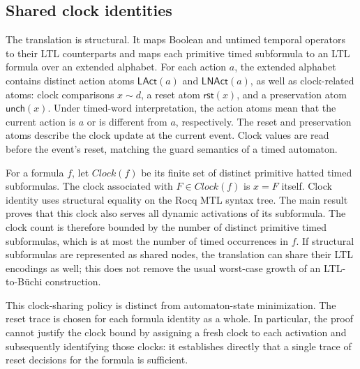 \documentclass[manuscript]{acmart}
\providecommand{\Reset}{}\renewcommand{\Reset}{\mathsf{rst}}
\newcommand{\Unch}{\mathsf{unch}}
\newcommand{\Clock}{\mathit{Clock}}
\begin{document}
\subsection{Shared clock identities}
The translation is structural. It maps Boolean and untimed temporal
operators to their LTL counterparts and maps each primitive timed subformula to an LTL
formula over an extended alphabet. For each action $a$, the extended
alphabet contains distinct action atoms $\mathsf{LAct}(a)$ and
$\mathsf{LNAct}(a)$, as well as clock-related atoms: clock comparisons
$x\sim d$, a reset atom
$\Reset(x)$, and a preservation atom $\Unch(x)$. Under timed-word
interpretation, the action atoms mean that the current action is $a$ or is
different from $a$, respectively. The reset
and preservation atoms describe the clock update at the current event. Clock
values are read before the event's reset, matching the guard semantics of a
timed automaton.

For a formula $f$, let $\Clock(f)$ be its finite set of distinct primitive
hatted timed subformulas. The clock associated with $F\in\Clock(f)$ is
$x=F$ itself. Clock identity uses structural equality on the Rocq MTL syntax
tree. The main result proves that this clock
also serves all dynamic activations of its subformula.
The clock count is therefore bounded by the number of distinct primitive
timed subformulas, which is at most the number of timed occurrences in $f$.
If structural subformulas are represented as shared nodes, the translation
can share their LTL encodings as well; this does not remove the usual
worst-case growth of an LTL-to-B\"uchi construction.

This clock-sharing policy is distinct from automaton-state minimization. The
reset trace is chosen for each formula identity as a whole. In particular,
the proof cannot justify the clock bound
by assigning a fresh clock to each activation and subsequently identifying
those clocks: it establishes directly that a single trace of reset decisions
for the formula is sufficient.
\end{document}
